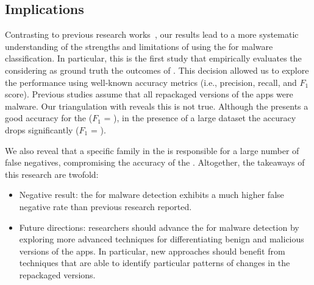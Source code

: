 
\subsection{Implications}\label{sec:implications} 

Contrasting to previous research works~\cite{DBLP:conf/wcre/BaoLL18,DBLP:conf/iceccs/LeB0GL18,DBLP:journals/jss/CostaMMSSBNR22},
our results 
lead to a more systematic understanding
of the strengths and limitations of using the \mas
for malware classification. In particular, this is the
first study that empirically evaluates the \mas
considering as ground truth the outcomes
of \vt. This decision allowed us to explore the
\mas performance using well-known accuracy metrics (i.e., precision, recall, and
$F_1$ score). Previous studies assume that all repackaged versions of the
apps were malware. Our triangulation with \vt reveals this is not true. Although
the \mas presents a good accuracy for the \sds ($F_1$ = \fscoreSmall), 
in the presence of a large dataset the \mas accuracy drops significantly ($F_1$ = \fscore). 

We also reveal that a specific family in the \cds is responsible for a large number of false negatives,
compromising the accuracy of the \mas.
Altogether, the takeaways of this research are twofold:

\begin{itemize}
  \item Negative result: the \mas for malware detection exhibits a much higher false negative rate than previous research reported. 

  \item Future directions: researchers should advance the \mas for malware detection by exploring more advanced
    techniques for differentiating benign and malicious versions of the apps. In particular, new approaches should benefit from techniques
    that are able to identify particular patterns of changes in the repackaged versions. 
\end{itemize}  


